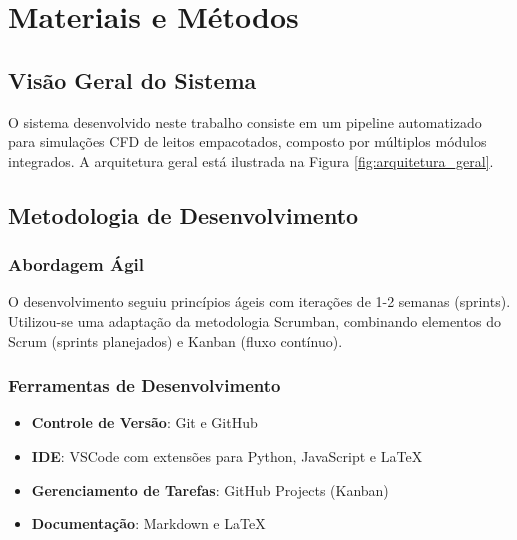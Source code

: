 \chapter{Materiais e Métodos}
\label{cap:materiais}

\section{Visão Geral do Sistema}

O sistema desenvolvido neste trabalho consiste em um pipeline automatizado para simulações CFD de leitos empacotados, composto por múltiplos módulos integrados. A arquitetura geral está ilustrada na Figura \ref{fig:arquitetura_geral}.


\section{Metodologia de Desenvolvimento}

\subsection{Abordagem Ágil}

O desenvolvimento seguiu princípios ágeis com iterações de 1-2 semanas (sprints). Utilizou-se uma adaptação da metodologia Scrumban, combinando elementos do Scrum (sprints planejados) e Kanban (fluxo contínuo).

\subsection{Ferramentas de Desenvolvimento}

\begin{itemize}
    \item \textbf{Controle de Versão}: Git e GitHub
    \item \textbf{IDE}: VSCode com extensões para Python, JavaScript e LaTeX
    \item \textbf{Gerenciamento de Tarefas}: GitHub Projects (Kanban)
    \item \textbf{Documentação}: Markdown e LaTeX
\end{itemize}


